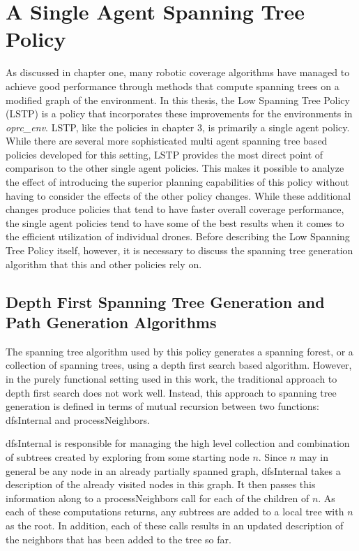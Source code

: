 \section{A Single Agent Spanning Tree Policy}

As discussed in chapter one, many robotic coverage algorithms have managed to achieve good performance through methods that compute spanning trees on a modified graph of the environment. In this thesis, the Low Spanning Tree Policy (LSTP) is a policy that incorporates these improvements for the environments in \textit{oprc\_env}. LSTP, like the policies in chapter 3, is primarily a single agent policy. While there are several more sophisticated multi agent spanning tree based policies developed for this setting, LSTP provides the most direct point of comparison to the other single agent policies. This makes it possible to analyze the effect of introducing the superior planning capabilities of this policy without having to consider the effects of the other policy changes. While these additional changes produce policies that tend to have faster overall coverage performance, the single agent policies tend to have some of the best results when it comes to the efficient utilization of individual drones. Before describing the Low Spanning Tree Policy itself, however, it is necessary to discuss the spanning tree generation algorithm that this and other policies rely on.

\subsection{Depth First Spanning Tree Generation and Path Generation Algorithms}

The spanning tree algorithm used by this policy generates a spanning forest, or a collection of spanning trees, using a depth first search based algorithm. However, in the purely functional setting used in this work, the traditional approach to depth first search does not work well. Instead, this approach to spanning tree generation is defined in terms of mutual recursion between two functions: dfsInternal and processNeighbors.

dfsInternal is responsible for managing the high level collection and combination of subtrees created by exploring from some starting node $n$. Since $n$ may in general be any node in an already partially spanned graph, dfsInternal takes a description of the already visited nodes in this graph. It then passes this information along to a processNeighbors call for each of the children of $n$. As each of these computations returns, any subtrees are added to a local tree with $n$ as the root. In addition, each of these calls results in an updated description of the neighbors that has been added to the tree so far. 

